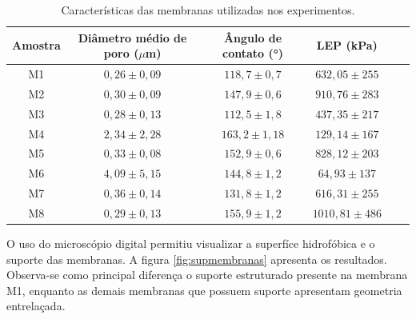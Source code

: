 

\begin{table}[H]
\centering
\caption{Características das membranas utilizadas nos experimentos.}
\label{tab:caracteristicas_membranas}
\begin{tabular}{cccccc}
\hline
Amostra &
Diâmetro médio de poro ($\mu$m) &
Ângulo de contato (°) &
LEP (kPa) \\

\hline

M1 & $0,26 \pm 0,09$ & $118,7 \pm 0,7$ & $632,05 \pm 255$ \\

M2 & $0,30 \pm 0,09$ & $147,9 \pm 0,6$ & $910,76 \pm 283$ \\

M3 & $0,28 \pm 0,13$ & $112,5 \pm 1,8$ & $437,35 \pm 217$ \\

M4 & $2,34 \pm 2,28$ & $163,2 \pm 1,18$ & $129,14 \pm 167$ \\

M5 & $0,33 \pm 0,08$ & $152,9 \pm 0,6$ & $828,12 \pm 203$ \\

M6 & $4,09 \pm 5,15$ & $144,8 \pm 1,2$ & $64,93 \pm 137$ \\

M7 & $0,36 \pm 0,14$ & $131,8 \pm 1,2$ & $616,31 \pm 255$ \\

M8 & $0,29 \pm 0,13$ & $155,9 \pm 1,2$ & $1010,81 \pm 486$ \\

\hline
\end{tabular}
\end{table}

O uso do microscópio digital permitiu visualizar a superfíce hidrofóbica e o suporte das membranas. A figura \ref{fig:supmembranas} apresenta os resultados. Observa-se como principal diferença o suporte estruturado presente na membrana M1, enquanto as demais membranas que possuem suporte apresentam geometria entrelaçada.

